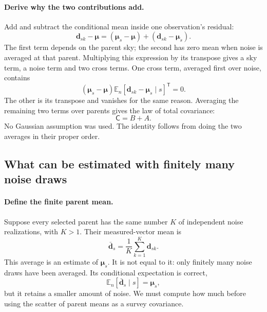 \documentclass[11pt]{article}
\newcommand{\Cov}{\mathsf{C}}
\newcommand{\T}{^{\mathsf{T}}}
\newcommand{\E}{\mathbb{E}}
\begin{document}
\paragraph{Derive why the two contributions add.}
Add and subtract the conditional mean inside one observation's residual:
\begin{equation}
 \boldsymbol d_{sk}-\boldsymbol\mu
 = (\boldsymbol\mu_s-\boldsymbol\mu)
   +(\boldsymbol d_{sk}-\boldsymbol\mu_s).
\end{equation}
The first term depends on the parent sky; the second has zero mean when
noise is averaged at that parent. Multiplying this expression by its
transpose gives a sky term, a noise term and two cross terms. One cross
term, averaged first over noise, contains
\begin{equation}
 (\boldsymbol\mu_s-\boldsymbol\mu)
 \E_n[\boldsymbol d_{sk}-\boldsymbol\mu_s\mid s]\T=0.
\end{equation}
The other is its transpose and vanishes for the same reason. Averaging the
remaining two terms over parents gives the law of total covariance:
\begin{equation}
 \Cov=B+A.
 \label{eq:total}
\end{equation}
No Gaussian assumption was used. The identity follows from doing the two
averages in their proper order.

\subsection{What can be estimated with finitely many noise draws}
\paragraph{Define the finite parent mean.}
Suppose every selected parent has the same number $K$ of independent
noise realizations, with $K>1$. Their measured-vector mean is
\begin{equation}
 \bar{\boldsymbol d}_s=\frac1K\sum_{k=1}^{K}\boldsymbol d_{sk}.
\end{equation}
This average is an estimate of $\boldsymbol\mu_s$. It is not equal to it:
only finitely many noise draws have been averaged. Its conditional
expectation is correct,
\begin{equation}
 \E_n[\bar{\boldsymbol d}_s\mid s]=\boldsymbol\mu_s,
\end{equation}
but it retains a smaller amount of noise. We must compute how much before
using the scatter of parent means as a survey covariance.
\end{document}
